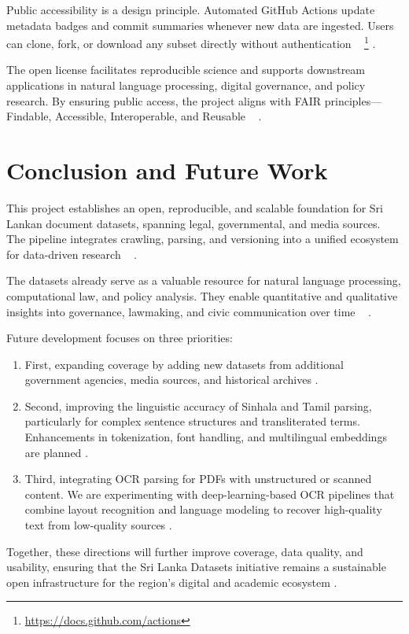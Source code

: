 \documentclass[10pt,a4paper]{article}%
\begin{document}
%
Public accessibility is a design principle.
 Automated GitHub Actions update metadata badges
 and commit summaries whenever new data are
 ingested. Users can clone, fork, or download
 any subset directly without authentication%
~%
\footnote{\href{https://docs.github.com/actions}{https://docs.github.com/actions}}%
.%

%
The open license facilitates reproducible
 science and supports downstream applications
 in natural language processing, digital
 governance, and policy research. By ensuring
 public access, the project aligns with FAIR
 principles—Findable, Accessible, Interoperable,
 and Reusable%
~%
\citep{FAIRPrinciples2016}%
.%

%
\section{Conclusion and Future Work}%
\label{sec:ConclusionandFutureWork}%
This project establishes an open, reproducible,
 and scalable foundation for Sri Lankan document
 datasets, spanning legal, governmental, and
 media sources. The pipeline integrates crawling,
 parsing, and versioning into a unified
 ecosystem for data-driven research%
~%
\citep{OpenDataPractices2020}%
.%

%
The datasets already serve as a valuable
 resource for natural language processing,
 computational law, and policy analysis. They
 enable quantitative and qualitative insights
 into governance, lawmaking, and civic
 communication over time%
~%
\citep{FAIRPrinciples2016}%
.%

%
Future development focuses on three priorities:%

%
\begin{enumerate}%

%
\item First, expanding coverage by adding new datasets from additional government agencies, media sources, and historical archives .%

%
\item Second, improving the linguistic accuracy of Sinhala and Tamil parsing, particularly for complex sentence structures and transliterated terms. Enhancements in tokenization, font handling, and multilingual embeddings are planned .%

%
\item Third, integrating OCR parsing for PDFs with unstructured or scanned content. We are experimenting with deep-learning-based OCR pipelines that combine layout recognition and language modeling to recover high-quality text from low-quality sources .%

%
\end{enumerate}%

%
Together, these directions will further improve coverage, data quality, and usability, ensuring that the Sri Lanka Datasets initiative remains a sustainable open infrastructure for the region’s digital and academic ecosystem .%

%
%
%
\end{document}
